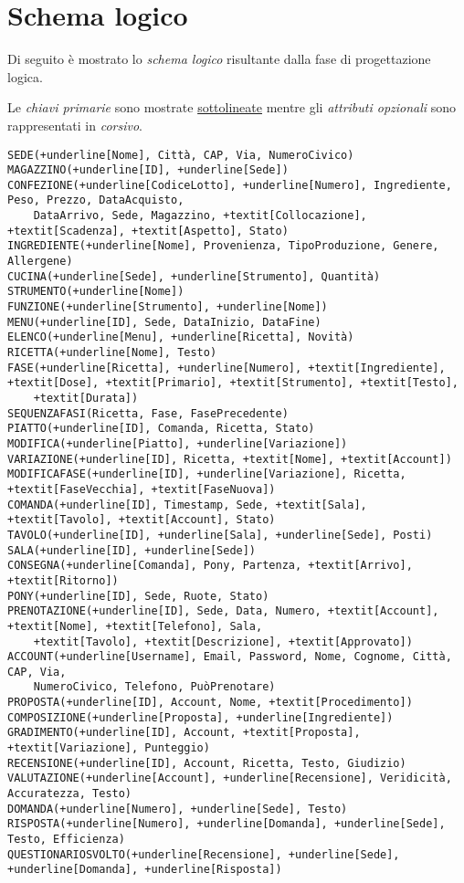 \section{Schema logico}\label{sec:scheme}
Di seguito è mostrato lo {\it schema logico} risultante dalla fase di progettazione logica.

Le {\it chiavi primarie} sono mostrate \underline{sottolineate} mentre gli {\it attributi opzionali}
sono rappresentati in \textit{corsivo}.

\begin{Verbatim}[commandchars=+\[\]]
SEDE(+underline[Nome], Città, CAP, Via, NumeroCivico)
MAGAZZINO(+underline[ID], +underline[Sede])
CONFEZIONE(+underline[CodiceLotto], +underline[Numero], Ingrediente, Peso, Prezzo, DataAcquisto,
    DataArrivo, Sede, Magazzino, +textit[Collocazione], +textit[Scadenza], +textit[Aspetto], Stato)
INGREDIENTE(+underline[Nome], Provenienza, TipoProduzione, Genere, Allergene)
CUCINA(+underline[Sede], +underline[Strumento], Quantità)
STRUMENTO(+underline[Nome])
FUNZIONE(+underline[Strumento], +underline[Nome])
MENU(+underline[ID], Sede, DataInizio, DataFine)
ELENCO(+underline[Menu], +underline[Ricetta], Novità)
RICETTA(+underline[Nome], Testo)
FASE(+underline[Ricetta], +underline[Numero], +textit[Ingrediente], +textit[Dose], +textit[Primario], +textit[Strumento], +textit[Testo],
    +textit[Durata])
SEQUENZAFASI(Ricetta, Fase, FasePrecedente)
PIATTO(+underline[ID], Comanda, Ricetta, Stato)
MODIFICA(+underline[Piatto], +underline[Variazione])
VARIAZIONE(+underline[ID], Ricetta, +textit[Nome], +textit[Account])
MODIFICAFASE(+underline[ID], +underline[Variazione], Ricetta, +textit[FaseVecchia], +textit[FaseNuova])
COMANDA(+underline[ID], Timestamp, Sede, +textit[Sala], +textit[Tavolo], +textit[Account], Stato)
TAVOLO(+underline[ID], +underline[Sala], +underline[Sede], Posti)
SALA(+underline[ID], +underline[Sede])
CONSEGNA(+underline[Comanda], Pony, Partenza, +textit[Arrivo], +textit[Ritorno])
PONY(+underline[ID], Sede, Ruote, Stato)
PRENOTAZIONE(+underline[ID], Sede, Data, Numero, +textit[Account], +textit[Nome], +textit[Telefono], Sala,
    +textit[Tavolo], +textit[Descrizione], +textit[Approvato])
ACCOUNT(+underline[Username], Email, Password, Nome, Cognome, Città, CAP, Via,
    NumeroCivico, Telefono, PuòPrenotare)
PROPOSTA(+underline[ID], Account, Nome, +textit[Procedimento])
COMPOSIZIONE(+underline[Proposta], +underline[Ingrediente])
GRADIMENTO(+underline[ID], Account, +textit[Proposta], +textit[Variazione], Punteggio)
RECENSIONE(+underline[ID], Account, Ricetta, Testo, Giudizio)
VALUTAZIONE(+underline[Account], +underline[Recensione], Veridicità, Accuratezza, Testo)
DOMANDA(+underline[Numero], +underline[Sede], Testo)
RISPOSTA(+underline[Numero], +underline[Domanda], +underline[Sede], Testo, Efficienza)
QUESTIONARIOSVOLTO(+underline[Recensione], +underline[Sede], +underline[Domanda], +underline[Risposta])
\end{Verbatim}
